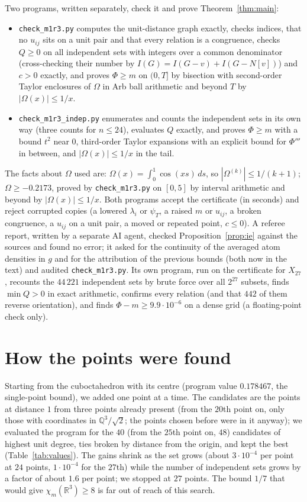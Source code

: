 \documentclass[11pt,a4paper]{amsart}
\theoremstyle{remark}
\newcommand{\Q}{\mathbb{Q}}
\newcommand{\R}{\mathbb{R}}
\newcommand{\NPTS}{27}
\newcommand{\NATOMS}{44\,221}
\newcommand{\NREV}{442}
\begin{document}
Two programs, written separately, check it and prove Theorem~\ref{thm:main}:
\begin{itemize}
\item \texttt{check\_m1r3.py} computes the unit-distance graph exactly, checks indices, that no $u_{ij}$ sits on a unit
pair and that every relation is a congruence, checks $Q\ge0$ on all independent sets with integers over a common
denominator (cross-checking their number by $I(G)=I(G-v)+I(G-N[v])$) and $c>0$ exactly, and proves $\Phi\ge m$ on $(0,T]$
by bisection with second-order Taylor enclosures of $\Omega$ in Arb ball arithmetic and beyond $T$ by $|\Omega(x)|\le1/x$.
\item \texttt{check\_m1r3\_indep.py} enumerates and counts the independent sets in its own way (three counts for $n\le24$),
evaluates $Q$ exactly, and proves $\Phi\ge m$ with a bound $t^2$ near $0$, third-order Taylor expansions with an explicit
bound for $\Phi'''$ in between, and $|\Omega(x)|\le1/x$ in the tail.
\end{itemize}
The facts about $\Omega$ used are: $\Omega(x)=\int_0^1\cos(xs)\,ds$, so $|\Omega^{(k)}|\le1/(k+1)$; $\Omega\ge-0.2173$,
proved by \texttt{check\_m1r3.py} on $[0,5]$ by interval arithmetic and beyond by $|\Omega(x)|\le1/x$. Both programs accept
the certificate (in seconds) and reject corrupted copies (a lowered $\lambda_i$ or $\psi_T$, a raised $m$ or $u_{ij}$, a
broken congruence, a $u_{ij}$ on a unit pair, a moved or repeated point, $c\le0$). A referee report, written by a separate AI agent, checked Proposition~\ref{prop:ie} against the sources and found no error; it asked for the continuity of the averaged atom densities in $g$ and for the attribution of the previous bounds (both now in the text) and audited \texttt{check\_m1r3.py}. Its own program, run on the certificate for $X_{\NPTS}$, recounts the $\NATOMS$ independent sets by brute force over all $2^{\NPTS}$ subsets, finds $\min Q>0$ in exact arithmetic, confirms every relation (and that $\NREV$ of them reverse orientation), and finds $\Phi-m\ge9.9\cdot10^{-6}$ on a dense grid (a floating-point check only).

\section{How the points were found}\label{sec:search}

Starting from the cuboctahedron with its centre (program value $0.178467$, the single-point bound), we added one point at
a time. The candidates are the points at distance $1$ from three points already present (from the $20$th point on, only
those with coordinates in $\Q^3/\sqrt2$; the points chosen before were in it anyway); we evaluated the program for the
$40$ (from the $25$th point on, $48$) candidates of highest unit degree, ties broken by distance from the origin, and kept
the best (Table~\ref{tab:values}). The gains shrink as the set grows (about $3\cdot10^{-4}$ per point at $24$ points,
$1\cdot10^{-4}$ for the $27$th) while the number of independent sets grows by a factor of about $1.6$ per point; we stopped
at $27$ points. The bound $1/7$ that would give $\chi_m(\R^3)\ge8$ is far out of reach of this search.
\end{document}
